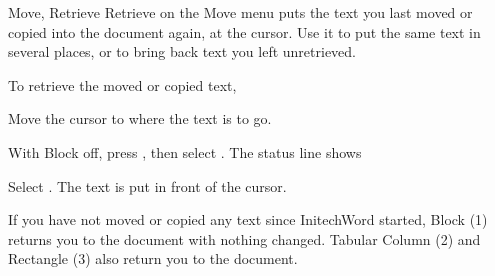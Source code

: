 \begin{Feature}{Move, Retrieve}
Retrieve on the Move menu puts the text you last moved or copied into the
document again, at the cursor.  Use it to put the same text in several
places, or to bring back text you left unretrieved.

To retrieve the moved or copied text,
\begin{WPSteps}
\item Move the cursor to where the text is to go.
\item With Block off, press , then select
.  The status line shows
\item Select .  The text is put in front of the cursor.
\end{WPSteps}

\Notes
{}
If you have not moved or copied any text since InitechWord started, Block
(1) returns you to the document with nothing changed.  Tabular Column (2)
and Rectangle (3) also return you to the document.

\end{Feature}

